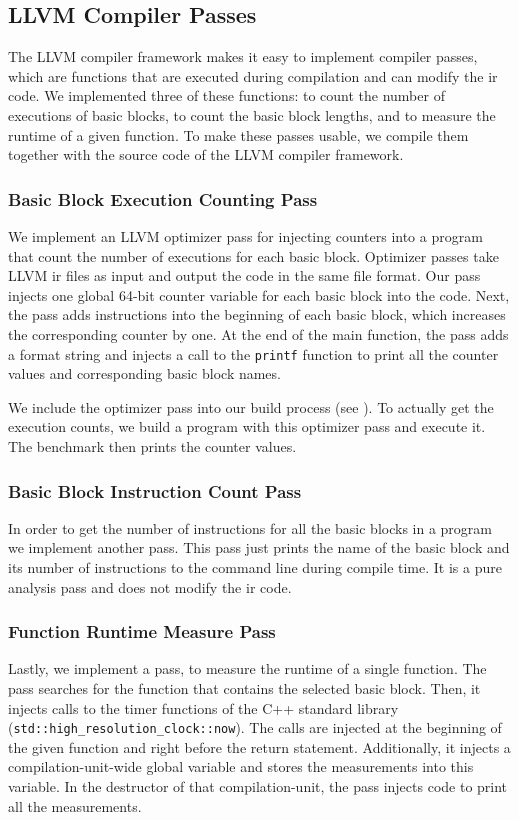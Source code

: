 \subsection{LLVM Compiler Passes}
\label{sec:approach:llvm-passes}
The LLVM compiler framework makes it easy to implement compiler passes, which are functions that are executed during compilation and can modify the \ac{ir} code.
We implemented three of these functions: to count the number of executions of basic blocks, to count the basic block lengths, and to measure the runtime of a given function.
To make these passes usable, we compile them together with the source code of the LLVM compiler framework.

\subsubsection{Basic Block Execution Counting Pass}
\label{sec:approach:pass-count}
We implement an LLVM optimizer pass for injecting counters into a program that count the number of executions for each basic block.
Optimizer passes take LLVM \ac{ir} files as input and output the code in the same file format.
Our pass injects one global 64-bit counter variable for each basic block into the code.
Next, the pass adds instructions into the beginning of each basic block, which increases the corresponding counter by one.
At the end of the main function, the pass adds a format string and injects a call to the \lstinline{printf} function to print all the counter values and corresponding basic block names.

We include the optimizer pass into our build process (see ).
To actually get the execution counts, we build a program with this optimizer pass and execute it.
The benchmark then prints the counter values.

\subsubsection{Basic Block Instruction Count Pass}
\label{sec:approach:instr-count}
In order to get the number of instructions for all the basic blocks in a program we implement another pass.
This pass just prints the name of the basic block and its number of instructions to the command line during compile time.
It is a pure analysis pass and does not modify the \ac{ir} code.

\subsubsection{Function Runtime Measure Pass}
Lastly, we implement a pass, to measure the runtime of a single function.
The pass searches for the function that contains the selected basic block.
Then, it injects calls to the timer functions of the C++ standard library (\lstinline|std::high_resolution_clock::now|).
The calls are injected at the beginning of the given function and right before the return statement.
Additionally, it injects a compilation-unit-wide global variable and stores the measurements into this variable.
In the destructor of that compilation-unit, the pass injects code to print all the measurements.


